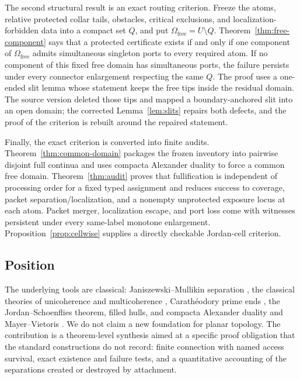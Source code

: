 \documentclass[11pt,reqno]{amsart}
\theoremstyle{definition}
\theoremstyle{remark}
\newcommand{\Omfree}{\Omega_{\mathrm{free}}}
\begin{document}
The second structural result is an exact routing criterion.  Freeze the
atoms, relative protected collar tails, obstacles, critical exclusions, and
localization-forbidden data into a compact set $Q$, and put
$\Omfree=U\setminus Q$.  Theorem~\ref{thm:free-component} says that a
protected certificate exists if and only if one component of $\Omfree$
admits simultaneous singleton ports to every required atom.  If no
component of this fixed free domain has simultaneous ports, the failure
persists under every connector enlargement respecting the same $Q$.  The
proof uses a one-ended slit lemma whose statement keeps
the free tips inside the residual domain.  The source version deleted those
tips and mapped a boundary-anchored slit into an open domain; the corrected
Lemma~\ref{lem:slits} repairs both defects, and the proof of the criterion is
rebuilt around the repaired statement.

Finally, the exact criterion is converted into finite audits.
Theorem~\ref{thm:common-domain} packages the frozen inventory into pairwise
disjoint full continua and uses compacta Alexander duality to force a common
free domain.  Theorem~\ref{thm:audit} proves that fullification is independent
of processing order for a fixed typed assignment and reduces success to
coverage, packet separation/localization, and a nonempty unprotected
exposure locus at each atom.  Packet merger, localization escape, and port
loss come with witnesses persistent under every same-label monotone
enlargement.  Proposition~\ref{prop:cellwise} supplies a directly checkable
Jordan-cell criterion.

\subsection{Position}

The underlying tools are classical: Janiszewski--\allowbreak Mullikin separation
\cite{Jan15,Mul22,New51,Why42}, the classical theories of unicoherence and
multicoherence \cite{Bor31,Eil36}, Carath\'eodory prime ends \cite{Pom92}, the
Jordan--Schoenflies theorem, filled hulls, and compacta Alexander duality and
Mayer--Vietoris \cite[Chapter~6]{Spa66}.  We do not claim a new foundation
for planar topology.  The contribution is a theorem-level synthesis aimed
at a specific proof obligation that the standard constructions do not
record: finite connection with named access survival, exact existence and
failure tests, and a quantitative accounting of the separations created or
destroyed by attachment.
\end{document}
